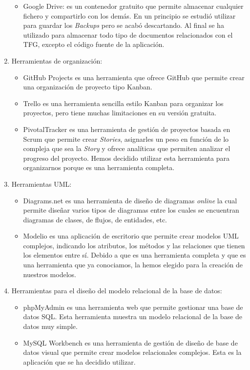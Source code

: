 \documentclass[11pt]{book}
\begin{document}
\begin{enumerate}
\begin{itemize}
		\item Google Drive: es un contenedor gratuito que permite almacenar cualquier fichero y compartirlo con los demás. En un principio se estudió utilizar para guardar los \textit{Backups} pero se acabó descartando. Al final se ha utilizado para almacenar todo tipo de documentos relacionados con el TFG, excepto el código fuente de la aplicación.
	\end{itemize}
	\item Herramientas de organización: 
	\begin{itemize} 
		\item GitHub Projects es una herramienta que ofrece GitHub que permite crear una organización de proyecto tipo Kanban.
		\item Trello es una herramienta sencilla estilo Kanban para organizar los proyectos, pero tiene muchas limitaciones en su versión gratuita.
		\item PivotalTracker es una herramienta de gestión de proyectos basada en Scrum que permite crear \textit{Stories}, asignarles un peso en función de lo compleja que sea la \textit{Story} y ofrece analíticas que permiten analizar el progreso del proyecto. Hemos decidido utilizar esta herramienta para organizarnos porque es una herramienta completa.
	\end{itemize}
	\item Herramientas UML: 
	\begin{itemize} 
		\item Diagrams.net es una herramienta de diseño de diagramas \textit{online} la cual permite diseñar varios tipos de diagramas entre los cuales se encuentran diagramas de clases, de flujos, de entidades, etc.
		\item Modelio es una aplicación de escritorio que permite crear modelos UML complejos, indicando los atributos, los métodos y las relaciones que tienen los elementos entre sí. Debido a que es una herramienta completa y que es una herramienta que ya conociamos, la hemos elegido para la creación de nuestros modelos.
	\end{itemize}
	\item Herramientas para el diseño del modelo relacional de la base de datos: 
	\begin{itemize} 
		\item phpMyAdmin es una herramienta web que permite gestionar una base de datos SQL. Esta herramienta muestra un modelo relacional de la base de datos muy simple.
		\item MySQL Workbench es una herramienta de gestión de diseño de base de datos visual que permite crear modelos relacionales complejos. Esta es la aplicación que se ha decidido utilizar.

\end{itemize}
\end{enumerate}
\end{document}
